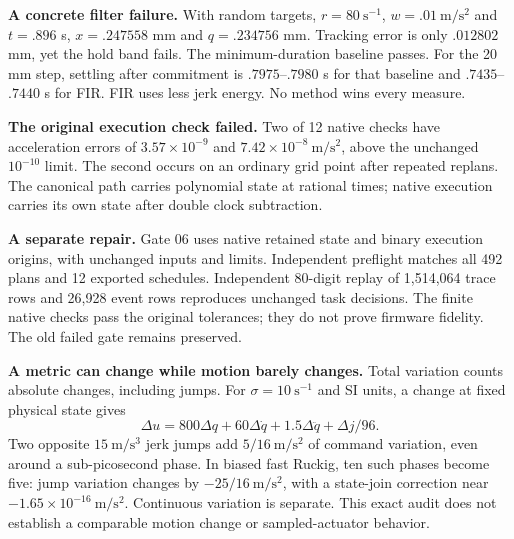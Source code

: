 \textbf{A concrete filter failure.} With random targets, $r=80\ \mathrm{s}^{-1}$, $w=.01\ \mathrm{m/s^2}$ and $t=.896$ s, $x=.247558$ mm and $q=.234756$ mm. Tracking error is only $.012802$ mm, yet the hold band fails. The minimum-duration baseline passes. For the 20 mm step, settling after commitment is $.7975$--$.7980$ s for that baseline and $.7435$--$.7440$ s for FIR. FIR uses less jerk energy. No method wins every measure.

\textbf{The original execution check failed.} Two of 12 native checks have acceleration errors of $3.57\times10^{-9}$ and $7.42\times10^{-8}\ \mathrm{m/s^2}$, above the unchanged $10^{-10}$ limit. The second occurs on an ordinary grid point after repeated replans. The canonical path carries polynomial state at rational times; native execution carries its own state after double clock subtraction.

\textbf{A separate repair.} Gate 06 uses native retained state and binary execution origins, with unchanged inputs and limits. Independent preflight matches all 492 plans and 12 exported schedules. Independent 80-digit replay of 1,514,064 trace rows and 26,928 event rows reproduces unchanged task decisions. The finite native checks pass the original tolerances; they do not prove firmware fidelity. The old failed gate remains preserved.

\textbf{A metric can change while motion barely changes.} Total variation counts absolute changes, including jumps. For $\sigma=10\ \mathrm{s}^{-1}$ and SI units, a change at fixed physical state gives
\[
\Delta u=800\Delta q+60\Delta\dot q+1.5\Delta\ddot q+\Delta j/96.
\]
Two opposite $15\ \mathrm{m/s^3}$ jerk jumps add $5/16\ \mathrm{m/s^2}$ of command variation, even around a sub-picosecond phase. In biased fast Ruckig, ten such phases become five: jump variation changes by $-25/16\ \mathrm{m/s^2}$, with a state-join correction near $-1.65\times10^{-16}\ \mathrm{m/s^2}$. Continuous variation is separate. This exact audit does not establish a comparable motion change or sampled-actuator behavior.
